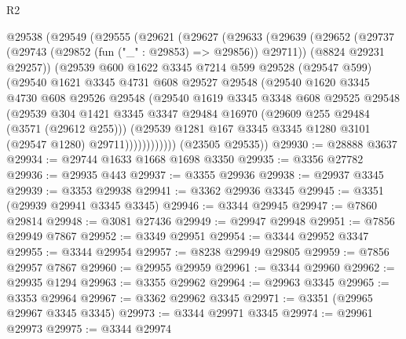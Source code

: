 \begin{lexlean}{R2}
\begin{coremodule}
    @29538
      (@29549
        (@29555
          (@29621
            (@29627
              (@29633
                (@29639
                  (@29652
                    (@29737 (@29743 (@29852 (fun ("_" : @29853) => @29856)) @29711))
                    (@8824 @29231 @29257))
                  (@29539
                    @600
                    @1622
                    @3345
                    @7214
                    @599
                    @29528
                    (@29547 @599)
                    (@29540
                      @1621
                      @3345
                      @4731
                      @608
                      @29527
                      @29548
                      (@29540
                        @1620
                        @3345
                        @4730
                        @608
                        @29526
                        @29548
                        (@29540
                          @1619
                          @3345
                          @3348
                          @608
                          @29525
                          @29548
                          (@29539
                            @304
                            @1421
                            @3345
                            @3347
                            @29484
                            @16970
                            (@29609 @255 @29484 (@3571 (@29612 @255)))
                            (@29539
                              @1281
                              @167
                              @3345
                              @3345
                              @1280
                              @3101
                              (@29547 @1280)
                              @29711))))))))))))
      (@23505 @29535))
@29930 := @28888 @3637
@29934 := @29744 @1633 @1668 @1698 @3350
@29935 := @3356 @27782
@29936 := @29935 @443
@29937 := @3355 @29936
@29938 := @29937 @3345
@29939 := @3353 @29938
@29941 := @3362 @29936 @3345
@29945 := @3351 (@29939 @29941 @3345 @3345)
@29946 := @3344 @29945
@29947 := @7860 @29814
@29948 := @3081 @27436
@29949 := @29947 @29948
@29951 := @7856 @29949 @7867
@29952 := @3349 @29951
@29954 := @3344 @29952 @3347
@29955 := @3344 @29954
@29957 := @8238 @29949 @29805
@29959 := @7856 @29957 @7867
@29960 := @29955 @29959
@29961 := @3344 @29960
@29962 := @29935 @1294
@29963 := @3355 @29962
@29964 := @29963 @3345
@29965 := @3353 @29964
@29967 := @3362 @29962 @3345
@29971 := @3351 (@29965 @29967 @3345 @3345)
@29973 := @3344 @29971 @3345
@29974 := @29961 @29973
@29975 := @3344 @29974

\end{coremodule}
\end{lexlean}
